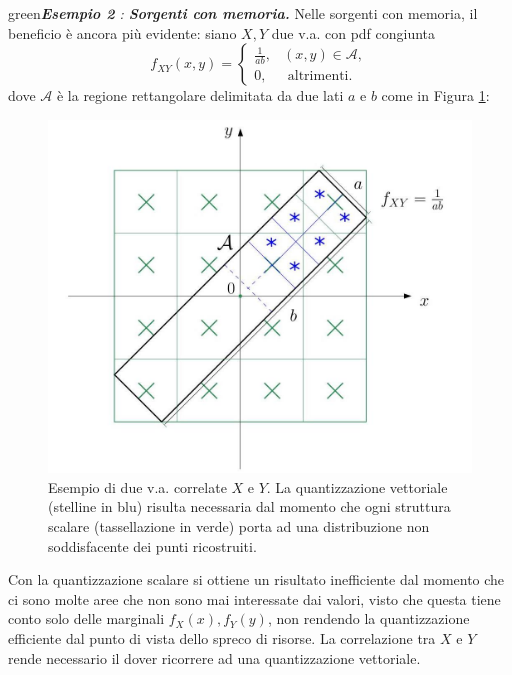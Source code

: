 \begin{mybox}{green}{\textit{\textbf{Esempio 2} : \textbf{Sorgenti con memoria. }}}
Nelle sorgenti con memoria, il beneficio è ancora più evidente: siano $X,Y$ due v.a. con pdf congiunta
\begin{equation}
    f_{XY}(x,y) = \begin{cases}
    \frac{1}{ab}, & (x,y) \in \mathcal{A}, \\
    0, & \text{ altrimenti.}
    \end{cases}
\end{equation}
dove $\mathcal{A}$ \`e la regione rettangolare delimitata da due lati $a$ e $b$ come in Figura \ref{fig:rett}:
\begin{figure}[H]
    \centering
    \includegraphics[scale=0.2]{img/rettang.jpg}
    \caption{Esempio di due v.a. correlate $X$ e $Y$. La quantizzazione vettoriale (stelline in blu) risulta necessaria dal momento che ogni struttura scalare (tassellazione in verde) porta ad una distribuzione non soddisfacente dei punti ricostruiti.}
    \label{fig:rett}
\end{figure}
Con la quantizzazione scalare si ottiene un risultato inefficiente dal momento che ci sono molte aree che non sono mai interessate dai valori, visto che questa tiene conto solo delle marginali $f_X(x), f_Y(y)$, non rendendo la quantizzazione efficiente dal punto di vista dello spreco di risorse. La correlazione tra $X$ e $Y$ rende necessario il dover ricorrere ad una quantizzazione vettoriale.
\end{mybox}